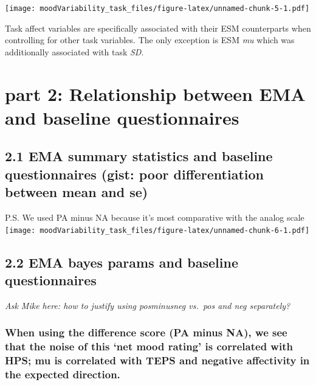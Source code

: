 \documentclass[
]{article}
\begin{document}
\texttt{[image: moodVariability\_task\_files/figure-latex/unnamed-chunk-5-1.pdf]}

Task affect variables are specifically associated with their ESM
counterparts when controlling for other task variables. The only
exception is ESM \emph{mu} which was additionally associated with task
\emph{SD}.

\hypertarget{part-2-relationship-between-ema-and-baseline-questionnaires}{%
\section{part 2: Relationship between EMA and baseline
questionnaires}\label{part-2-relationship-between-ema-and-baseline-questionnaires}}

\hypertarget{ema-summary-statistics-and-baseline-questionnaires-gist-poor-differentiation-between-mean-and-se}{%
\subsection{2.1 EMA summary statistics and baseline questionnaires
(gist: poor differentiation between mean and
se)}\label{ema-summary-statistics-and-baseline-questionnaires-gist-poor-differentiation-between-mean-and-se}}

P.S. We used PA minus NA because it's most comparative with the analog
scale
\texttt{[image: moodVariability\_task\_files/figure-latex/unnamed-chunk-6-1.pdf]}

\hypertarget{ema-bayes-params-and-baseline-questionnaires}{%
\subsection{2.2 EMA bayes params and baseline
questionnaires}\label{ema-bayes-params-and-baseline-questionnaires}}

\emph{Ask Mike here: how to justify using posminusneg vs.~pos and neg
separately?}

\hypertarget{when-using-the-difference-score-pa-minus-na-we-see-that-the-noise-of-this-net-mood-rating-is-correlated-with-hps-mu-is-correlated-with-teps-and-negative-affectivity-in-the-expected-direction.}{%
\subsubsection{When using the difference score (PA minus NA), we see
that the noise of this `net mood rating' is correlated with HPS; mu is
correlated with TEPS and negative affectivity in the expected
direction.}\label{when-using-the-difference-score-pa-minus-na-we-see-that-the-noise-of-this-net-mood-rating-is-correlated-with-hps-mu-is-correlated-with-teps-and-negative-affectivity-in-the-expected-direction.}}
\end{document}
